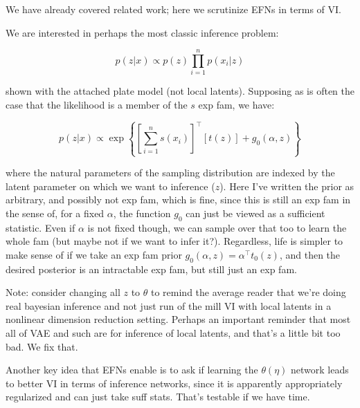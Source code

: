 \documentclass{article}
\begin{document}
 We have already covered related work; here we scrutinize EFNs in terms of VI.
 
We are interested in perhaps the most classic inference problem:

$$p(z | x) \propto p(z) \prod_{i=1}^n p(x_i | z)$$

 shown with the attached plate model (not local latents).  Supposing as is often the case that the likelihood is a member of the $s$ exp fam, we have:
 
 $$p(z | x ) \propto \exp\left\{ \left[ \sum_{i=1}^n s(x_i) \right]^\top\left[ t(z) \right] + g_0(\alpha,z) \right\}$$
 
 where the natural parameters of the sampling distribution are indexed by the latent parameter on which we want to inference ($z$).  Here I've written the prior as arbitrary, and possibly not exp fam, which is fine, since this is still an exp fam in the  sense of, for a fixed $\alpha$, the function $g_0$ can just be viewed as a sufficient statistic.  Even if $\alpha$ is not fixed though, we can sample over that too to learn the whole fam (but maybe not if we want to infer it?).  Regardless, life is simpler to make sense of if we take an exp fam prior $g_0(\alpha,z) = \alpha^\top t_0(z)$, and then the desired posterior is an intractable exp fam, but still just an exp fam.
 
 Note: consider changing all $z$ to $\theta$ to remind the average reader that we're doing real bayesian inference and not just run of the mill VI with local latents in a nonlinear dimension reduction setting.  Perhaps an important reminder that most all of VAE and such are for inference of local latents, and that's a little bit too bad.  We fix that.

Another key  idea that EFNs enable is to ask if learning the $\theta(\eta)$ network leads to better VI in terms of inference networks, since it is apparently appropriately regularized and can just take suff stats.  That's testable if we have time.
\end{document}

